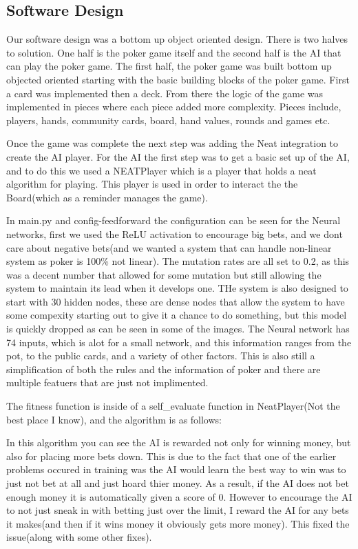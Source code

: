 \subsection{Software Design}
Our software design was a bottom up object oriented design. There is two halves to solution. One half is the poker game itself and the second half is the AI that can play the poker game. The first half, the poker game was built bottom up objected oriented starting with the basic building blocks of the poker game. First a card was implemented then a deck. From there the logic of the game was implemented in pieces where each piece added more complexity. Pieces include, players, hands, community cards, board, hand values, rounds and games etc. 

Once the game was complete the next step was adding the Neat integration to create the AI player. For the AI
the first step was to get a basic set up of the AI, and to do this we used a NEATPlayer which is a player that
holds a neat algorithm for playing. This player is used in order to interact the the Board(which as a reminder
manages the game).

In main.py and config-feedforward the configuration can be seen for the Neural networks, first we used the ReLU
activation to encourage big bets, and we dont care about negative bets(and we wanted a system that can handle
non-linear system as poker is 100\% not linear). The mutation rates are all set to 0.2, as this was a decent
number that allowed for some mutation but still allowing the system to maintain its lead when it develops one.
THe system is also designed to start with 30 hidden nodes, these are dense nodes that allow the system to have
some compexity starting out to give it a chance to do something, but this model is quickly dropped as can be
seen in some of the images. The Neural network has 74 inputs, which is alot for a small network, and this
information ranges from the pot, to the public cards, and a variety of other factors. This is also still a
simplification of both the rules and the information of poker and there are multiple featuers that are just not implimented.

The fitness function is inside of a self\_evaluate function in NeatPlayer(Not the best place I know), and the
algorithm is as follows: 

In this algorithm you can see the AI is rewarded not only for winning money, but also for placing more bets
down. This is due to the fact that one of the earlier problems occured in training was the AI would learn the
best way to win was to just not bet at all and just hoard thier money. As a result, if the AI does not bet
enough money it is automatically given a score of 0. However to encourage the AI to not just sneak in with betting just over the limit, I reward the AI for any bets it makes(and then if it wins money it obviously gets more
money). This fixed the issue(along with some other fixes).

